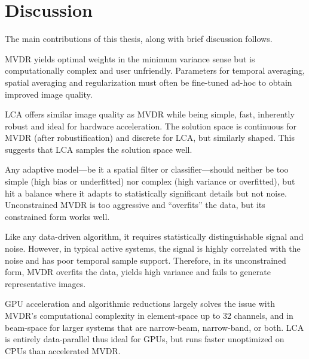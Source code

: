 
\endofdump

\ifRootBuild\else
  
  \makeglossaries
\fi



\chapter{Discussion}

The main contributions of this thesis, along with brief discussion follows.

MVDR yields optimal weights in the minimum variance sense but is computationally complex and user unfriendly. Parameters for temporal averaging, spatial averaging and regularization must often be fine-tuned ad-hoc to obtain improved image quality.

LCA offers similar image quality as MVDR while being simple, fast, inherently robust and ideal for hardware acceleration. The solution space is continuous for MVDR (after robustification) and discrete for LCA, but similarly shaped. This suggests that LCA samples the solution space well.

Any adaptive model---be it a spatial filter or classifier---should neither be too simple (high bias or underfitted) nor complex (high variance or overfitted), but hit a balance where it adapts to statistically significant details but not noise. Unconstrained MVDR is too aggressive and ``overfits'' the data, but its constrained form works well.


Like any data-driven algorithm, it requires statistically distinguishable signal and noise. However, in typical active systems, the signal is highly correlated with the noise and has poor temporal sample support. Therefore, in its unconstrained form, MVDR overfits the data, yields high variance and fails to generate representative images.

%

GPU acceleration and algorithmic reductions largely solves the issue with MVDR's computational complexity in element-space up to 32 channels, and in beam-space for larger systems that are narrow-beam, narrow-band, or both. LCA is entirely data-parallel thus ideal for GPUs, but runs faster unoptimized on CPUs than accelerated MVDR.%


